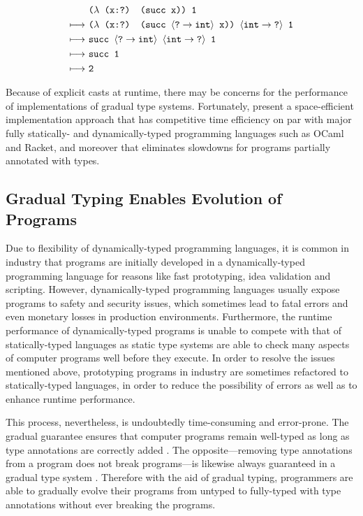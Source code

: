 \begin{align*}
& \text{\tt ($\lambda$ (x:?) (succ x)) 1} \\
    \longmapsto \ & \text{\tt ($\lambda$ (x:?) (succ $\langle \text{\tt ?} \rightarrow \text{\tt int} \rangle$ x)) $\langle \text{\tt int} \rightarrow \text{\tt ?} \rangle$ 1} \\
    \longmapsto \ & \text{\tt succ $\langle \text{\tt ?} \rightarrow \text{\tt int} \rangle$ $\langle \text{\tt int} \rightarrow \text{\tt ?} \rangle$ 1} \\
    \longmapsto \ & \text{\tt succ 1} \\
    \longmapsto \ & \text{\tt 2}
\end{align*}

Because of explicit casts at runtime, there may be concerns for the performance of implementations of gradual type systems. Fortunately, \citet{kuhlenschmidt2018efficient} present a space-efficient implementation approach that has competitive time efficiency on par with major fully statically- and dynamically-typed programming languages such as OCaml and Racket, and moreover that eliminates slowdowns for programs partially annotated with types.

\subsection{Gradual Typing Enables Evolution of Programs}
Due to flexibility of dynamically-typed programming languages, it is common in industry that programs are initially developed in a dynamically-typed programming language for reasons like fast prototyping, idea validation and scripting. However, dynamically-typed programming languages usually expose programs to safety and security issues, which sometimes lead to fatal errors and even monetary losses in production environments. Furthermore, the runtime performance of dynamically-typed programs is unable to compete with that of statically-typed languages as static type systems are able to check many aspects of computer programs well before they execute. In order to resolve the issues mentioned above, prototyping programs in industry are sometimes refactored to statically-typed languages, in order to reduce the possibility of errors as well as to enhance runtime performance.

This process, nevertheless, is undoubtedly time-consuming and error-prone. The gradual guarantee ensures that computer programs remain well-typed as long as type annotations are correctly added \cite{siek2015refined}. The opposite---removing type annotations from a program does not break programs---is likewise always guaranteed in a gradual type system \cite{siek2015refined}. Therefore with the aid of gradual typing, programmers are able to gradually evolve their programs from untyped to fully-typed with type annotations without ever breaking the programs.

